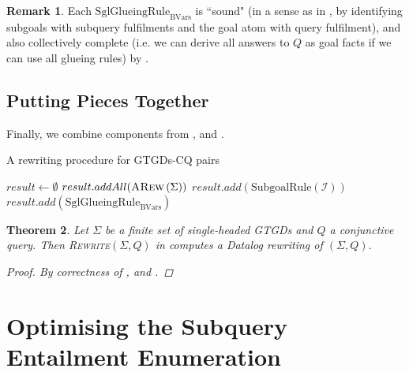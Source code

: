 \documentclass[12pt]{report}
\theoremstyle{plain}
\newtheorem{theorem}{Theorem}[chapter]
\theoremstyle{definition}
\newtheorem{remark}[theorem]{Remark}
\def\FV{{\mathrm{FV}}}
\def\Vars{{\mathrm{Vars}}}
\newcommand{\ARew}[1]{\ensuremath{\normalfont{\textsc{ARew}} \left( #1 \right)}}
\begin{document}
\begin{remark}
\label{glueing-rule-soundness-and-completeness}
  Each $\mathrm{SglGlueingRule}_\mathrm{BVars}$ is ``sound" (in a sense as in , by identifying subgoals with subquery fulfilments and the goal atom with query fulfilment), and also collectively complete (i.e. we can derive all answers to $Q$ as goal facts if we can use all glueing rules) by .
\end{remark}

\subsection{Putting Pieces Together}

Finally, we combine components from ,  and .

\begin{algorithm}
\caption{A rewriting procedure for GTGDs-CQ pairs}
\label{gtgds-cq-rewriting-procedure}
\begin{algorithmic}[1]
  \State $result \gets \emptyset$
  \State $result.addAll(\ARew{\Sigma})$
    \State $result.add(\mathrm{SubgoalRule}(\mathcal{I}))$
  \EndFor
  \For{\textbf{each} $\FV(Q) \subseteq \mathrm{BVars} \subseteq \Vars(Q)$ }
    \State $result.add(\mathrm{SglGlueingRule}_{\mathrm{BVars}})$
  \EndFor
  \State {}
\EndProcedure
\end{algorithmic}
\end{algorithm}

\begin{theorem}
  Let $\Sigma$ be a finite set of single-headed GTGDs and $Q$ a conjunctive query. Then \textsc{Rewrite}$(\Sigma, Q)$ in  computes a Datalog rewriting of $(\Sigma, Q)$.
  \begin{proof}
    By correctness of ,  and .
  \end{proof}
\end{theorem}

\section{Optimising the Subquery Entailment Enumeration}
\label{secomputation-optimisations}
\end{document}
